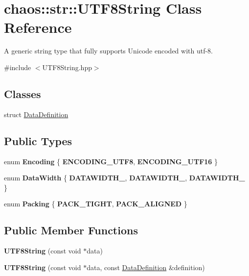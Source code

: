 \hypertarget{classchaos_1_1str_1_1_u_t_f8_string}{\section{chaos\-:\-:str\-:\-:U\-T\-F8\-String Class Reference}
\label{classchaos_1_1str_1_1_u_t_f8_string}
}


A generic string type that fully supports Unicode encoded with utf-\/8.  




{\ttfamily \#include $<$U\-T\-F8\-String.\-hpp$>$}

\subsection*{Classes}
\begin{DoxyCompactItemize}
\item 
struct \hyperlink{structchaos_1_1str_1_1_u_t_f8_string_1_1_data_definition}{Data\-Definition}
\end{DoxyCompactItemize}
\subsection*{Public Types}
\begin{DoxyCompactItemize}
\item 
enum {\bfseries Encoding} \{ {\bfseries E\-N\-C\-O\-D\-I\-N\-G\-\_\-\-U\-T\-F8}, 
{\bfseries E\-N\-C\-O\-D\-I\-N\-G\-\_\-\-U\-T\-F16}
 \}
\item 
enum {\bfseries Data\-Width} \{ {\bfseries D\-A\-T\-A\-W\-I\-D\-T\-H\-\_}, 
{\bfseries D\-A\-T\-A\-W\-I\-D\-T\-H\-\_}, 
{\bfseries D\-A\-T\-A\-W\-I\-D\-T\-H\-\_}
 \}
\item 
enum {\bfseries Packing} \{ {\bfseries P\-A\-C\-K\-\_\-\-T\-I\-G\-H\-T}, 
{\bfseries P\-A\-C\-K\-\_\-\-A\-L\-I\-G\-N\-E\-D}
 \}
\end{DoxyCompactItemize}
\subsection*{Public Member Functions}
\begin{DoxyCompactItemize}
\item 
\hypertarget{classchaos_1_1str_1_1_u_t_f8_string_a2e3c55adf04b4c2370b97e2f7d9b51d6}{{\bfseries U\-T\-F8\-String} (const void $\ast$data)}\label{classchaos_1_1str_1_1_u_t_f8_string_a2e3c55adf04b4c2370b97e2f7d9b51d6}

\item 
\hypertarget{classchaos_1_1str_1_1_u_t_f8_string_a5582dc5e2644ceb895a5d577c08cc72b}{{\bfseries U\-T\-F8\-String} (const void $\ast$data, const \hyperlink{structchaos_1_1str_1_1_u_t_f8_string_1_1_data_definition}{Data\-Definition} \&definition)}\label{classchaos_1_1str_1_1_u_t_f8_string_a5582dc5e2644ceb895a5d577c08cc72b}

\end{DoxyCompactItemize}


